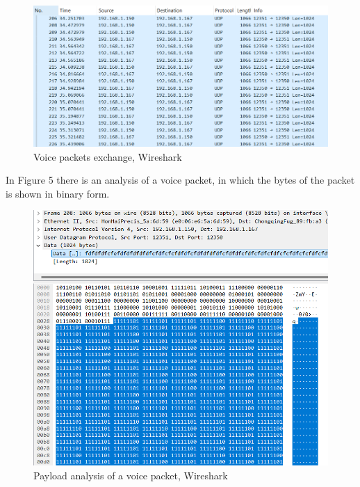 \documentclass{article}
\begin{document}
\begin{figure}[h!]
    \centering
    \includegraphics[width=1\linewidth]{image4.png}
    \caption{Voice packets exchange, Wireshark}
    \label{fig:enter-label}
\end{figure}

\newpage
In Figure 5 there is an analysis of a voice packet, in which the bytes of the packet is shown in binary form.
\newline
\begin{figure}[h!]
    \centering
    \includegraphics[width=1\linewidth]{image5.png}
    \caption{Payload analysis of a voice packet, Wireshark}
    \label{fig:enter-label}
\end{figure}
\end{document}
